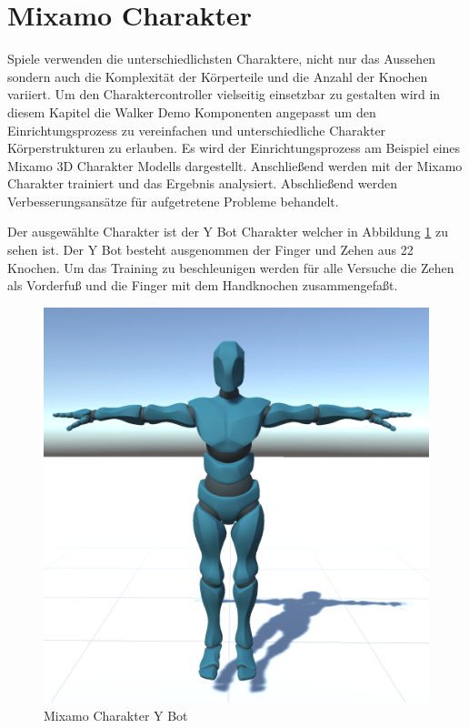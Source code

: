 \section{Mixamo Charakter}
Spiele verwenden die unterschiedlichsten Charaktere, nicht nur das Aussehen sondern auch die Komplexität der Körperteile und die Anzahl der Knochen variiert. Um den Charaktercontroller vielseitig einsetzbar zu gestalten wird in diesem Kapitel die Walker Demo Komponenten angepasst um den Einrichtungsprozess zu vereinfachen und unterschiedliche Charakter Körperstrukturen zu erlauben. Es wird der Einrichtungsprozess am Beispiel eines Mixamo 3D Charakter Modells dargestellt. Anschließend werden mit der Mixamo Charakter trainiert und das Ergebnis analysiert. Abschließend werden Verbesserungsansätze für aufgetretene Probleme behandelt.

Der ausgewählte Charakter ist der Y Bot Charakter welcher in Abbildung \ref{fig:y_bot} zu sehen ist. Der Y Bot besteht ausgenommen der Finger und Zehen aus 22 Knochen. Um das Training zu beschleunigen werden für alle Versuche die Zehen als Vorderfuß und die Finger mit dem Handknochen zusammengefaßt.

\begin{figure}[H]
  \centering  
  \includegraphics[scale=0.5]{img/y_bot.png}
  \caption{Mixamo Charakter Y Bot}
  \label{fig:y_bot}
\end{figure}

